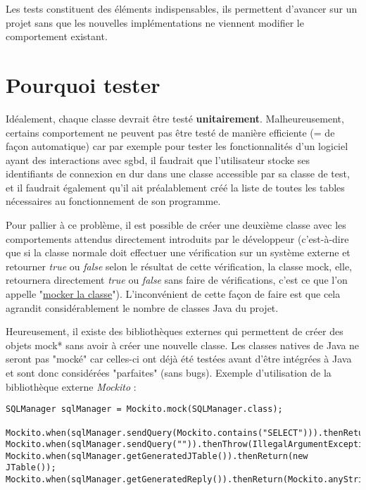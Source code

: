 Les tests constituent des éléments indispensables, ils permettent d'avancer sur un projet sans que les nouvelles implémentations ne viennent modifier le comportement existant.
\section{Pourquoi tester}


Idéalement, chaque classe devrait être testé \textbf{unitairement}.
Malheureusement, certains comportement ne peuvent pas être testé de manière efficiente (= de façon automatique) car par exemple pour tester les fonctionnalités d'un logiciel ayant des interactions avec \gls{sgbd}, il faudrait que l'utilisateur stocke ses identifiants de connexion en dur dans une classe accessible par sa classe de test, et il faudrait également qu'il ait préalablement créé la liste de toutes les tables nécessaires au fonctionnement de son programme.
\bigbreak

Pour pallier à ce problème, il est possible de créer une deuxième classe avec les comportements attendus directement introduits par le développeur (c'est-à-dire que si la classe normale doit effectuer une vérification sur un système externe et retourner \textit{true} ou \textit{false} selon le résultat de cette vérification, la classe mock, elle, retournera directement \textit{true} ou \textit{false} sans faire de vérifications, c'est ce que l'on appelle "\underline{mocker la classe}"). L'inconvénient de cette façon de faire est que cela agrandit considérablement le nombre de classes Java du projet.


\bigbreak
  Heureusement, il existe des bibliothèques externes qui permettent de créer des objets \gls{mock}* sans avoir à créer une nouvelle classe.
Les classes natives de Java ne seront pas "mocké" car celles-ci ont déjà été testées avant d'être intégrées à Java et sont donc considérées "parfaites" (sans bugs).
\bigbreak
Exemple d'utilisation de la bibliothèque externe \textit{Mockito} :

\begin{lstlisting}
SQLManager sqlManager = Mockito.mock(SQLManager.class);

Mockito.when(sqlManager.sendQuery(Mockito.contains("SELECT"))).thenReturn(true);
Mockito.when(sqlManager.sendQuery("")).thenThrow(IllegalArgumentException.class);
Mockito.when(sqlManager.getGeneratedJTable()).thenReturn(new JTable());
Mockito.when(sqlManager.getGeneratedReply()).thenReturn(Mockito.anyString());

\end{lstlisting}
\bigbreak

